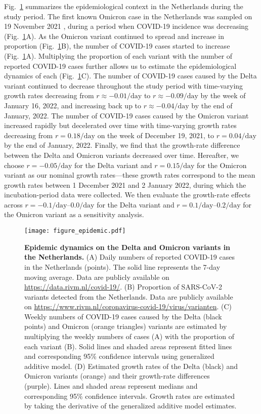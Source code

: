 \documentclass[12pt]{article}
\newcommand{\fref}[1]{Fig.~\ref{fig:#1}}
\begin{document}
\fref{epidemic} summarizes the epidemiological context in the Netherlands during the study period.
The first known Omicron case in the Netherlands was sampled on 19 November 2021 \citep{backer2021omicron}, during a period when COVID-19 incidence was decreasing (\fref{epidemic}A).
As the Omicron variant continued to spread and increase in proportion (\fref{epidemic}B), the number of COVID-19 cases started to increase (\fref{epidemic}A).
Multiplying the proportion of each variant with the number of reported COVID-19 cases further allows us to estimate the epidemiological dynamics of each (\fref{epidemic}C).
The number of COVID-19 cases caused by the Delta variant continued to decrease throughout the study period with time-varying growth rates decreasing from $r \approx -0.01/\mathrm{day}$ to $r \approx -0.09/\mathrm{day}$ by the week of January 16, 2022, and increasing back up to $r \approx -0.04/\mathrm{day}$ by the end of January, 2022.
The number of COVID-19 cases caused by the Omicron variant increased rapidly but decelerated over time with time-varying growth rates decreasing from $r=0.18/\mathrm{day}$ on the week of December 19, 2021, to $r=0.04/\mathrm{day}$ by the end of January, 2022.
Finally, we find that the growth-rate difference between the Delta and Omicron variants decreased over time.
Hereafter, we choose $r=-0.05/\mathrm{day}$ for the Delta variant and $r=0.15/\mathrm{day}$ for the Omicron variant as our nominal growth rates---these growth rates correspond to the mean growth rates between 1 December 2021 and 2 January 2022, during which the incubation-period data were collected.
We then evaluate the growth-rate effects across $r=-0.1/\mathrm{day}$--$0.0/\mathrm{day}$ for the Delta variant and $r=0.1/\mathrm{day}$--$0.2/\mathrm{day}$ for the Omicron variant as a sensitivity analysis.

\begin{figure}[!ht]
\texttt{[image: figure\_epidemic.pdf]}
\caption{
\textbf{Epidemic dynamics on the Delta and Omicron variants in the Netherlands.}
(A) Daily numbers of reported COVID-19 cases in the Netherlands (points).
The solid line represents the 7-day moving average.
Data are publicly available on \url{https://data.rivm.nl/covid-19/}.
(B) Proportion of SARS-CoV-2 variants detected from the Netherlands. Data are publicly available on \url{https://www.rivm.nl/coronavirus-covid-19/virus/varianten}.
(C) Weekly numbers of COVID-19 cases caused by the Delta (black points) and Omicron (orange triangles) variants are estimated by multiplying the weekly numbers of cases (A) with the proportion of each variant (B).
Solid lines and shaded areas represent fitted lines and corresponding 95\% confidence intervals using generalized additive model.
(D) Estimated growth rates of the Delta (black) and Omicron variants (orange) and their growth-rate differences (purple).
Lines and shaded areas represent medians and corresponding 95\% confidence intervals.
Growth rates are estimated by taking the derivative of the generalized additive model estimates.
\label{fig:epidemic}
}
\end{figure}
\end{document}
